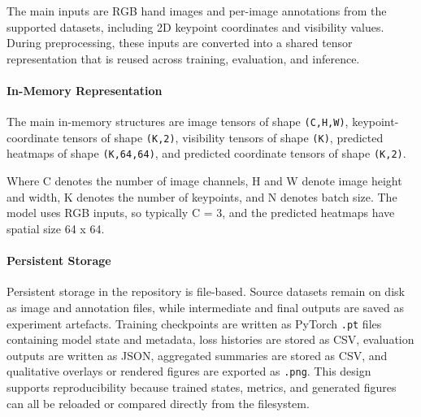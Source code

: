 ﻿\documentclass[11pt,a4paper]{article}
\begin{document}
The main inputs are RGB hand images and per-image annotations from the
supported datasets, including 2D keypoint coordinates and visibility values.
During preprocessing, these inputs are converted into a shared tensor
representation that is reused across training, evaluation, and inference.

\paragraph*{In-Memory Representation}

The main in-memory structures are image tensors of shape \texttt{(C,H,W)},
keypoint-coordinate tensors of shape \texttt{(K,2)}, visibility tensors of
shape \texttt{(K)}, predicted heatmaps of shape \texttt{(K,64,64)}, and
predicted coordinate tensors of shape \texttt{(K,2)}.

Where C denotes the number of image channels, H and W denote image height and
width, K denotes the number of keypoints, and N denotes batch size. The model
uses RGB inputs, so typically C = 3, and the predicted heatmaps have spatial
size 64 x 64.

\paragraph*{Persistent Storage}

Persistent storage in the repository is file-based. Source datasets remain on
disk as image and annotation files, while intermediate and final outputs are
saved as experiment artefacts. Training checkpoints are written as PyTorch
\texttt{.pt} files containing model state and metadata, loss histories are
stored as CSV, evaluation outputs are written as JSON, aggregated summaries
are stored as CSV, and qualitative overlays or rendered figures are exported
as \texttt{.png}. This design supports reproducibility because trained states,
metrics, and generated figures can all be reloaded or compared directly from
the filesystem.

\medskip
\end{document}
